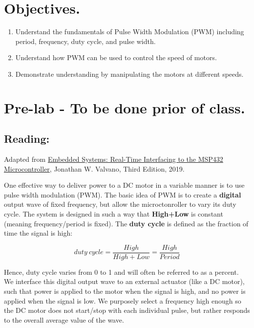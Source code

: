 \documentclass{handout}
\begin{document}
	\maketitle
	
	\section{Objectives.} 
	\begin{enumerate}
		\item Understand the fundamentals of Pulse Width Modulation (PWM) including period, frequency, duty cycle, and pulse width.
		\item Understand how PWM can be used to control the speed of motors.
		\item Demonstrate understanding by manipulating the motors at different speeds.
	\end{enumerate}
	
	\section{Pre-lab - To be done prior of class.}
	\subsection{Reading:}
	Adapted from \underline{Embedded Systems: Real-Time Interfacing to the MSP432 Microcontroller}, Jonathan W. Valvano, Third Edition, 2019.
		
	One effective way to deliver power to a DC motor in a variable manner is to use pulse width modulation (PWM). The basic idea of PWM is to create a \textbf{digital} output wave of fixed frequency, but allow the microctonroller to vary its duty cycle. The system is designed in such a way that \textbf{High+Low} is constant (meaning frequency/period is fixed). The \textbf{duty cycle} is defined as the fraction of time the signal is high:
	
	\[
		duty\ cycle = \frac{High}{High + Low} = \frac{High}{Period}
	\]
	
	Hence, duty cycle varies from 0 to 1 and will often be referred to as a percent. We interface this digital output wave to an external actuator (like a DC motor), such that power is applied to the motor when the signal is high, and no power is applied when the signal is low. We purposely select a frequency high enough so the DC motor does not start/stop with each individual pulse, but rather responds to the overall average value of the wave.
	
\end{document}
